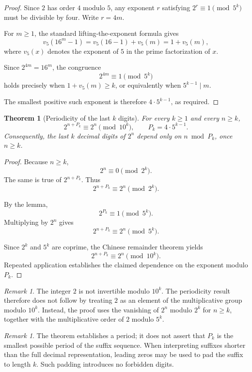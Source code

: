 \documentclass[11pt,a4paper]{article}
\theoremstyle{definition}
\theoremstyle{plain}
\newtheorem{theorem}[definition]{Theorem}
\theoremstyle{remark}
\newtheorem{remark}[definition]{Remark}
\begin{document}
\begin{proof}
Since \(2\) has order \(4\) modulo \(5\), any exponent \(r\)
satisfying \(2^r\equiv 1\pmod{5^k}\) must be divisible by
four. Write \(r=4m\).

For \(m\geq 1\), the standard lifting-the-exponent formula gives
\[
v_5(16^m-1)
=
v_5(16-1)+v_5(m)
=
1+v_5(m),
\]
where \(v_5(x)\) denotes the exponent of \(5\) in the prime
factorization of \(x\).

Since \(2^{4m}=16^m\), the congruence
\[
2^{4m}\equiv1\pmod{5^k}
\]
holds precisely when \(1+v_5(m)\geq k\), or equivalently
when \(5^{k-1}\mid m\).

The smallest positive such exponent is therefore
\(4\cdot5^{k-1}\), as required.
\end{proof}

\begin{theorem}[Periodicity of the last \(k\) digits]
For every \(k\geq1\) and every \(n\geq k\),
\[
2^{n+P_k}\equiv 2^n\pmod{10^k},
\qquad P_k=4\cdot5^{k-1}.
\]
Consequently, the last \(k\) decimal digits of \(2^n\) depend
only on \(n\bmod P_k\), once \(n\geq k\).
\end{theorem}

\begin{proof}
Because \(n\geq k\),
\[
2^n\equiv 0\pmod{2^k}.
\]
The same is true of \(2^{n+P_k}\). Thus
\[
2^{n+P_k}\equiv 2^n\pmod{2^k}.
\]

By the lemma,
\[
2^{P_k}\equiv1\pmod{5^k}.
\]
Multiplying by \(2^n\) gives
\[
2^{n+P_k}\equiv2^n\pmod{5^k}.
\]

Since \(2^k\) and \(5^k\) are coprime, the Chinese remainder
theorem yields
\[
2^{n+P_k}\equiv2^n\pmod{10^k}.
\]
Repeated application establishes the claimed dependence on
the exponent modulo \(P_k\).
\end{proof}

\begin{remark}
The integer \(2\) is not invertible modulo \(10^k\). The
periodicity result therefore does not follow by treating \(2\)
as an element of the multiplicative group modulo \(10^k\).
Instead, the proof uses the vanishing of \(2^n\) modulo \(2^k\)
for \(n\geq k\), together with the multiplicative order of
\(2\) modulo \(5^k\).
\end{remark}

\begin{remark}
The theorem establishes a period; it does not assert that
\(P_k\) is the smallest possible period of the suffix sequence.
When interpreting suffixes shorter than the full decimal
representation, leading zeros may be used to pad the suffix
to length \(k\). Such padding introduces no forbidden digits.
\end{remark}
\end{document}
